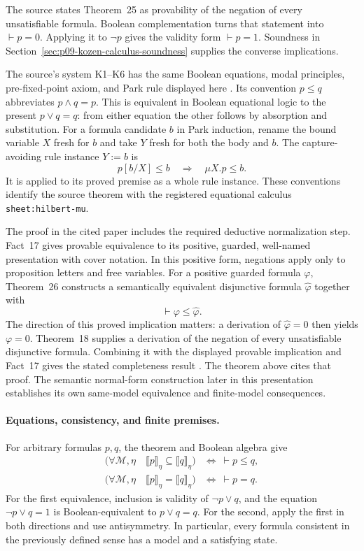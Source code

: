 The source states Theorem~25 as provability of the negation of every
unsatisfiable formula.  Boolean complementation turns that statement
into \(\vdash p=0\).  Applying it to \(\neg p\) gives the validity
form \(\vdash p=1\).  Soundness in
Section~\ref{sec:p09-kozen-calculus-soundness} supplies the converse
implications.

The source's system K1--K6 has the same Boolean equations, modal
principles, pre-fixed-point axiom, and Park rule displayed here
\cite[\S4]{Walukiewicz2000}.
Its convention \(p\leq q\) abbreviates \(p\land q=p\).
This is equivalent in Boolean equational logic to the present
\(p\lor q=q\): from either equation the other follows by absorption
and substitution.  For a formula candidate \(b\) in Park induction,
rename the bound variable \(X\) fresh for \(b\) and take \(Y\) fresh
for both the body and \(b\).  The capture-avoiding rule instance
\(Y:=b\) is
\[
 p[b/X]\leq b\quad\Longrightarrow\quad\mu X.p\leq b.
\]
It is applied to its proved premise as a whole rule instance.
These conventions identify the source theorem with the registered
equational calculus \texttt{sheet:hilbert-mu}.

The proof in the cited paper includes the required deductive
normalization step.  Fact~17 gives provable equivalence to its
positive, guarded, well-named presentation with cover notation.
In this positive form, negations apply only to proposition letters
and free variables.
For a positive guarded formula \(\varphi\), Theorem~26 constructs a
semantically equivalent disjunctive formula \(\widehat\varphi\)
together with
\[
 \vdash\varphi\leq\widehat\varphi.
\]
The direction of this proved implication matters: a derivation of
\(\widehat\varphi=0\) then yields \(\varphi=0\).
Theorem~18 supplies a derivation of the negation of every unsatisfiable
disjunctive formula.  Combining it with the displayed provable
implication and Fact~17 gives the stated completeness result
\cite[Fact~17 and Theorems~18, 25--26]{Walukiewicz2000}.
The theorem above cites that proof.  The semantic normal-form
construction later in this presentation establishes its own
same-model equivalence and finite-model consequences.

\paragraph{Equations, consistency, and finite premises.}
For arbitrary formulas \(p,q\), the theorem and Boolean algebra give
\[
\begin{aligned}
 \bigl(\forall\mathcal M,\eta\quad
       \llbracket p\rrbracket_\eta
          \subseteq\llbracket q\rrbracket_\eta\bigr)
    &\Longleftrightarrow\ \vdash p\leq q,\\
 \bigl(\forall\mathcal M,\eta\quad
       \llbracket p\rrbracket_\eta
          =\llbracket q\rrbracket_\eta\bigr)
    &\Longleftrightarrow\ \vdash p=q.
\end{aligned}
\]
For the first equivalence, inclusion is validity of
\(\neg p\lor q\), and the equation
\(\neg p\lor q=1\) is Boolean-equivalent to \(p\lor q=q\).
For the second, apply the first in both directions and use
antisymmetry.  In particular, every formula consistent in the
previously defined sense has a model and a satisfying state.

